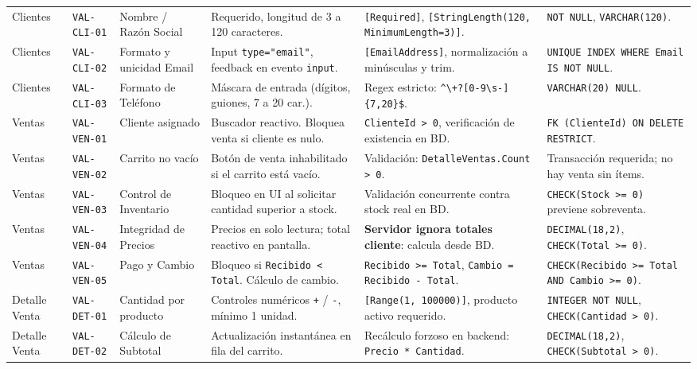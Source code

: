 \documentclass[10pt,a4paper,landscape]{article}
\begin{document}
\begin{table}[h!]
\begin{tabularx}{\textwidth}{l l p{3.6cm} p{5.5cm} p{6.5cm} X}
\midrule
Clientes & \texttt{VAL-CLI-01} & Nombre / Razón Social & Requerido, longitud de 3 a 120 caracteres. & \texttt{[Required]}, \texttt{[StringLength(120, MinimumLength=3)]}. & \texttt{NOT NULL}, \texttt{VARCHAR(120)}. \\
Clientes & \texttt{VAL-CLI-02} & Formato y unicidad Email & Input \texttt{type="email"}, feedback en evento \texttt{input}. & \texttt{[EmailAddress]}, normalización a minúsculas y trim. & \texttt{UNIQUE INDEX WHERE Email IS NOT NULL}. \\
Clientes & \texttt{VAL-CLI-03} & Formato de Teléfono & Máscara de entrada (dígitos, guiones, 7 a 20 car.). & Regex estricto: \texttt{\textasciicircum\textbackslash+?[0-9\textbackslash s-]\{7,20\}\$}. & \texttt{VARCHAR(20) NULL}. \\
\midrule
Ventas & \texttt{VAL-VEN-01} & Cliente asignado & Buscador reactivo. Bloquea venta si cliente es nulo. & \texttt{ClienteId > 0}, verificación de existencia en BD. & \texttt{FK (ClienteId) ON DELETE RESTRICT}. \\
Ventas & \texttt{VAL-VEN-02} & Carrito no vacío & Botón de venta inhabilitado si el carrito está vacío. & Validación: \texttt{DetalleVentas.Count > 0}. & Transacción requerida; no hay venta sin ítems. \\
Ventas & \texttt{VAL-VEN-03} & Control de Inventario & Bloqueo en UI al solicitar cantidad superior a stock. & Validación concurrente contra stock real en BD. & \texttt{CHECK(Stock >= 0)} previene sobreventa. \\
Ventas & \texttt{VAL-VEN-04} & Integridad de Precios & Precios en solo lectura; total reactivo en pantalla. & \textbf{Servidor ignora totales cliente}: calcula desde BD. & \texttt{DECIMAL(18,2)}, \texttt{CHECK(Total >= 0)}. \\
Ventas & \texttt{VAL-VEN-05} & Pago y Cambio & Bloqueo si \texttt{Recibido < Total}. Cálculo de cambio. & \texttt{Recibido >= Total}, \texttt{Cambio = Recibido - Total}. & \texttt{CHECK(Recibido >= Total AND Cambio >= 0)}. \\
\midrule
Detalle Venta & \texttt{VAL-DET-01} & Cantidad por producto & Controles numéricos \texttt{+} / \texttt{-}, mínimo 1 unidad. & \texttt{[Range(1, 100000)]}, producto activo requerido. & \texttt{INTEGER NOT NULL}, \texttt{CHECK(Cantidad > 0)}. \\
Detalle Venta & \texttt{VAL-DET-02} & Cálculo de Subtotal & Actualización instantánea en fila del carrito. & Recálculo forzoso en backend: \texttt{Precio * Cantidad}. & \texttt{DECIMAL(18,2)}, \texttt{CHECK(Subtotal > 0)}. \\
\bottomrule
\end{tabularx}
\end{table}
\end{document}
